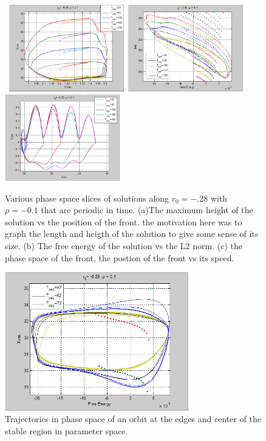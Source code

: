\documentclass[pre,preprint,superscriptaddress]{revtex4-1}
\begin{document}
\begin{figure}[!htb]
\begin{center}
    \mbox{
\includegraphics[width=50mm]{XumaxStable.png}
\includegraphics[width=50mm]{FEnormStable.png}
\includegraphics[width=50mm]{FrontPhase.png}
}
\caption{Various phase space slices of solutions along $r_0=-.28$ with $\rho=-0.1$ that are periodic in time.  (a)The maximum height of the solution vs the position of the front.  the motivation here was to graph the length and heigth of the solution to give some sense of its size.  (b) The free energy of the solution vs the L2 norm. (c) the phase space of the front, the postion of the front vs its speed.  }
    \label{fig:PhaseSlice}
\end{center}
\end{figure}



\begin{figure}[!htb]\center
\includegraphics[width=80mm]{XcmFEstablerange.png}
\caption{Trajectories in phase space of  an orbit at the edges and center of the stable region in parameter space.}
    \label{fig:PhaseSlice2}
\end{figure}
\end{document}
